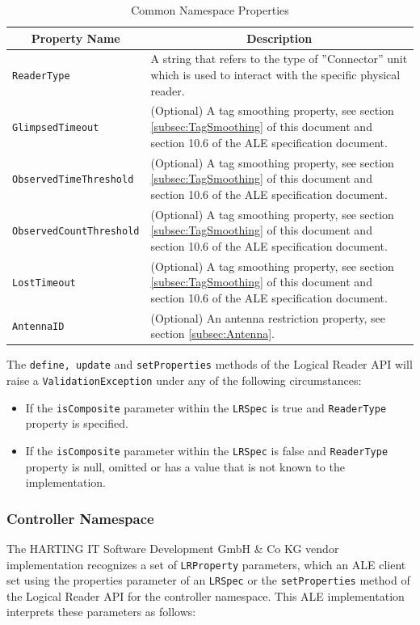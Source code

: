 \documentclass[11pt,a4paper,oneside]{article}
\begin{document}
\begin{table}[!h]
\begin{tabularx}{\linewidth}{|l|X|}
\hline
\multicolumn{1}{|c|}{\textbf{Property Name}}&
\multicolumn{1}{c|}{\textbf{Description}}\\
\hline
\texttt{ReaderType}&A string that refers to the type of ''Connector'' unit which is used to interact with the specific physical reader.\\
\hline
\texttt{GlimpsedTimeout}&(Optional) A tag smoothing property, see section \ref{subsec:TagSmoothing} of this document and section 10.6 of the ALE specification document.\\
\hline
\texttt{ObservedTimeThreshold}&(Optional) A tag smoothing property, see section \ref{subsec:TagSmoothing} of this document and section 10.6 of the ALE specification document.\\
\hline
\texttt{ObservedCountThreshold}&(Optional) A tag smoothing property, see section \ref{subsec:TagSmoothing} of this document and section 10.6 of the ALE specification document.\\
\hline
\texttt{LostTimeout}&(Optional) A tag smoothing property, see section \ref{subsec:TagSmoothing} of this document and section 10.6 of the ALE specification document.\\
\hline
\texttt{AntennaID}&(Optional) An antenna restriction property, see section \ref{subsec:Antenna}. \\
\hline
\end{tabularx}
\caption{Common Namespace Properties}
\MakeLineNo
\end{table}
\FloatBarrier

The \texttt{define, update} and \texttt{setProperties} methods of the Logical Reader API will raise a \texttt{ValidationException} under any of the following circumstances:

\begin{itemize}
\item 	If the \texttt{isComposite} parameter within the \texttt{LRSpec} is true and \texttt{ReaderType} property is specified.
\item	If the \texttt{isComposite} parameter within the \texttt{LRSpec} is false and \texttt{ReaderType} property is null, omitted or has a value that is not known to the implementation.
\end{itemize}

\subsubsection{Controller Namespace}
The HARTING IT Software Development GmbH \& Co KG vendor implementation recognizes a set of \texttt{LRProperty} parameters, which an ALE client set using the properties parameter of an \texttt{LRSpec} or the \texttt{setProperties} method of the Logical Reader API for the controller namespace. This ALE implementation interprets these parameters as follows:
\end{document}
